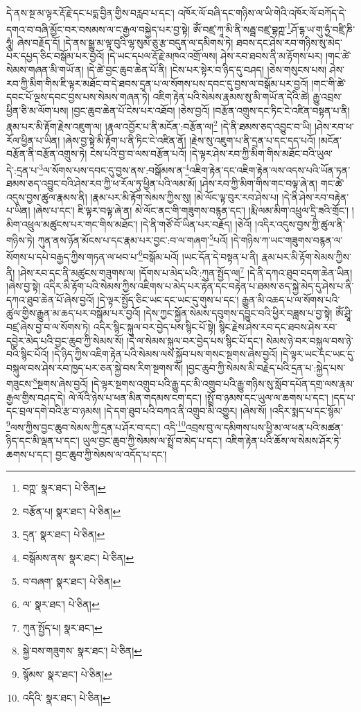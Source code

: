དེ་ནས་སྔ་མ་ལྟར་རྡོ་རྗེ་དང་པདྨ་བྱིན་གྱིས་བརླབ་པ་དང་། འཁོར་ལོ་བཞི་དང་གཉིས་ལ་ཡི་གེའི་འཁོར་ལོ་བཀོད་དེ་དགའ་བ་བཞི་མྱོང་བར་བསམས་ལ་ང་རྒྱལ་བསྐྱེད་པར་བྱ་སྟེ། ཨོཾ་བཛྲ་ཀཱ་མི་ནི་སརྦྦ་བཛྲ་བྷཀྵ་\footnote{བཀྵ་  སྣར་ཐང་།  པེ་ཅིན། }ཤོ་དྷ་ཡ་གུ་ཧྱཾ་བཛྲི་ཎི་ཧཱུཾ། ཞེས་བརྗོད་དོ། །དེ་ནས་སྒྱུ་མ་ལྟ་བུའི་ལྷ་སུམ་ཅུ་རྩ་བདུན་ལ་དམིགས་ཏེ། ཐབས་དང་ཤེས་རབ་གཉིས་སུ་མེད་པར་དཔྱད་ཅིང་བསྒོམ་པར་བྱའོ། །དེ་ཡང་དཔལ་རྡོ་རྗེ་མཁའ་འགྲོ་ལས། ཤེས་རབ་ཐབས་ནི་མ་རྟོགས་པར། །གང་ཚེ་སེམས་གཞན་མི་གཡོ་ན། །དེ་ཚེ་བྱང་ཆུབ་ཆེན་པོ་ནི། །ངེས་པར་སྟེར་བ་ཉིད་དུ་བཤད། །ཅེས་གསུངས་པས། ཤེས་རབ་ཀྱི་མིག་གིས་ཇི་ལྟར་མཐོང་བ་དེ་ཐབས་དྲན་པ་ལ་སོགས་པས་དབང་དུ་བྱས་ལ་བསྒོམ་པར་བྱའོ། །གང་གི་ཚེ་དབང་པོ་ལྔས་དབང་བྱས་པས་སེམས་གཞན་ཏེ། འཇིག་རྟེན་པའི་སེམས་རྣམས་སུ་མི་གཡོ་ན་དེའི་ཚེ། རྒྱུ་འབྲས་ཕྱིན་ཅི་མ་ལོག་པས། །བྱང་ཆུབ་ཆེན་པོ་ངེས་པར་འཐོབ། །ཅེས་བྱའོ། །བརྩོན་འགྲུས་དང་ཏིང་ངེ་འཛིན་བསྟན་པ་ནི། རྣམ་པར་མི་རྟོག་རྗེས་འཇུག་ལ། །རྣལ་འབྱོར་པ་ནི་མངོན་:བརྩོན་ལ།\footnote{བརྩོན་པ།  སྣར་ཐང་།  པེ་ཅིན། } །དེ་ནི་ཐམས་ཅད་འབྱུང་བ་ཡི། །ཤེས་རབ་ཕ་རོལ་ཕྱིན་པ་ཡིན། །ཞེས་བྱ་སྟེ་མི་རྟོག་པ་ནི་ཏིང་ངེ་འཛིན་ནོ། །རྗེས་སུ་འཇུག་པ་ནི་དྲན་པ་དང་དད་པའོ། །མངོན་བརྩོན་ནི་བརྩོན་འགྲུས་ཏེ། ངེས་པའི་བྱ་བ་ལས་བརྩོན་པའོ། །དེ་ལྟར་ཤེས་རབ་ཀྱི་མིག་གིས་མཐོང་བའི་ཡུལ་དེ་:དྲན་པ་\footnote{དྲན་  སྣར་ཐང་།  པེ་ཅིན། }ལ་སོགས་པས་དབང་དུ་བྱས་ནས་:བསྒོམས་ན་\footnote{བསྒོམས་ནས་  སྣར་ཐང་།  པེ་ཅིན། }འཇིག་རྟེན་དང་འཇིག་རྟེན་ལས་འདས་པའི་ཡོན་ཏན་ཐམས་ཅད་འབྱུང་བའི་ཤེས་རབ་ཀྱི་ཕ་རོལ་ཏུ་ཕྱིན་པའི་ལམ་མོ། །ཤེས་རབ་ཀྱི་མིག་གིས་གང་བལྟ་ཞེ་ན། གང་ཚེ་འདུས་བྱས་ཚུལ་རྣམས་ནི། །རྣམ་པར་མི་རྟོག་སེམས་ཀྱིས་སུ། །མེ་ལོང་ལྟ་བུར་རབ་ཤེས་པ། །དེ་ནི་ཤེས་རབ་བརྟེན་པ་ཡིན། །ཞེས་པ་དང་། ཇི་ལྟར་བལྟ་ཞེ་ན། མེ་ལོང་ནང་གི་གཟུགས་བརྙན་དང་། །རྨི་ལམ་མིག་འཕྲུལ་དྲི་ཟའི་གྲོང་། །མིག་འཕྲུལ་མཚུངས་པར་གང་གིས་མཐོང་། །དེ་ནི་གཙོ་བོ་ཡིན་པར་བརྗོད། །ཅེའོ། །འདིར་འདུས་བྱས་ཀྱི་ཚུལ་ནི་གཉིས་ཏེ། ཀུན་ནས་ཉོན་མོངས་པ་དང་རྣམ་པར་བྱང་:བ་ལ་གཞག་\footnote{བ་བཞག་  སྣར་ཐང་།  པེ་ཅིན། }པའོ། །དེ་གཉིས་ཀ་ཡང་གཟུགས་བརྙན་ལ་སོགས་པ་དཔེ་བརྒྱད་ཀྱིས་གཏན་ལ་ཕབ་པ་\footnote{ལ་  སྣར་ཐང་།  པེ་ཅིན། }བསྒོམ་པའོ། །ཡང་དོན་དེ་བསྟན་པ་ནི། རྣམ་པར་མི་རྟོག་སེམས་ཀྱིས་ནི། །ཤེས་རབ་དང་ནི་མཚུངས་གཟུགས་ལ། །དོགས་པ་མེད་པའི་:ཀུན་སྤྱོད་ལ།\footnote{ཀུན་སྤྱོད་པ།  སྣར་ཐང་། } །དེ་ནི་དཀའ་ཐུབ་བདག་ཆེན་ཡིན། །ཞེས་བྱ་སྟེ། འདིར་མི་རྟོག་པའི་སེམས་ཀྱིས་འཇིགས་པ་མེད་པར་རྟེན་དང་བརྟེན་པ་ཐམས་ཅད་སྐྱེ་མེད་དུ་ཤེས་པ་ནི་དཀའ་ཐུབ་ཆེན་པོ་ཞེས་བྱའོ། །དེ་ལྟར་སྤྱོད་ཅིང་ཡང་དང་ཡང་དུ་གུས་པ་དང་། རྒྱུན་མི་འཆད་པ་ལ་སོགས་པའི་ཚུལ་གྱིས་རྒྱུན་མ་ཆད་པར་བསྒོམ་པར་བྱའོ། །དེས་ཀྱང་སྐྱོན་སེམས་དབུགས་དབྱུང་བའི་ཕྱིར་བཟླས་པ་བྱ་སྟེ། ཨོཾ་ཤྲཱི་བཛྲ་ཞེས་བྱ་བ་ལ་སོགས་ཏེ། འདིར་སྙིང་སྐུལ་བར་བྱེད་པས་སྙིང་པོ་སྟེ། སྙིང་རྗེས་ཤེས་རབ་དང་ཐབས་ཤེས་རབ་དབྱེར་མེད་པའི་བྱང་ཆུབ་ཀྱི་སེམས་སོ། །དེ་ལ་སེམས་སྐུལ་བར་བྱེད་པས་སྙིང་པོ་དང་། སེམས་ཉེ་བར་བསྐུལ་བས་ཉེ་བའི་སྙིང་པོའོ། །དེ་ཉིད་ཀྱིས་འཇིག་རྟེན་པའི་སེམས་ལས་སྐྱོབ་པས་གསང་སྔགས་ཞེས་བྱའོ། །དེ་ལྟར་ཡང་དང་ཡང་དུ་བསྐུལ་བས་ཤེས་རབ་ཁྱད་པར་ཅན་སྐྱེ་བས་རིག་སྔགས་སོ། །བྱང་ཆུབ་ཀྱི་སེམས་མི་བརྗེད་པའི་དྲན་པ་:སྐྱེད་པས་གཟུངས་\footnote{སྐྱེ་བས་གཟུགས་  སྣར་ཐང་།  པེ་ཅིན། }སྔགས་ཞེས་བྱའོ། །དེ་ལྟར་སྔགས་འགྲུབ་པའི་རྒྱུ་དང་མི་འགྲུབ་པའི་རྒྱུ་གཉིས་སུ་སློབ་དཔོན་དགྲ་ལས་རྣམ་རྒྱལ་གྱིས་བཤད་དེ། ལེ་ལོའི་ཉེས་པ་ཕན་མིན་གདམས་ངག་དང་། །སྤྲོ་བ་ཉམས་དང་ཡུལ་ལ་ཆགས་པ་དང་། །དད་པ་དང་བྲལ་དགེ་བའི་རྩ་བ་ཉམས། །དེ་དག་ཐུབ་པའི་བཀའ་ནི་འགྲུབ་མི་འགྱུར། །ཞེས་སོ། །འདིར་སྨད་པ་དང་སྙོམ་\footnote{སྙོམས་  སྣར་ཐང་།  པེ་ཅིན། }ལས་ཀྱིས་བྱང་ཆུབ་སེམས་ཀྱི་དྲན་པ་ཤོར་བ་དང་། འདི་\footnote{འདིའི་  སྣར་ཐང་།  པེ་ཅིན། }འབྲས་བུ་ལ་དམིགས་པས་ཕྱི་མ་ལ་ཕན་པའི་མཚན་ཉིད་དང་མི་ལྡན་པ་དང་། ཡུལ་བྱང་ཆུབ་ཀྱི་སེམས་ལ་སྤྲོ་བ་མེད་པ་དང་། འཇིག་རྟེན་པའི་ཆོས་ལ་སེམས་ཤོར་ཏེ་ཆགས་པ་དང་། བྱང་ཆུབ་ཀྱི་སེམས་ལ་འདོད་པ་དང་། 